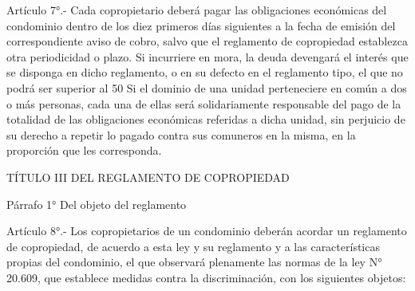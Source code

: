      
    Artículo 7°.- Cada copropietario deberá pagar las obligaciones económicas del condominio dentro de los diez primeros días siguientes a la fecha de emisión del correspondiente aviso de cobro, salvo que el reglamento de copropiedad establezca otra periodicidad o plazo. Si incurriere en mora, la deuda devengará el interés que se disponga en dicho reglamento, o en su defecto en el reglamento tipo, el que no podrá ser superior al 50%
    Si el dominio de una unidad perteneciere en común a dos o más personas, cada una de ellas será solidariamente responsable del pago de la totalidad de las obligaciones económicas referidas a dicha unidad, sin perjuicio de su derecho a repetir lo pagado contra sus comuneros en la misma, en la proporción que les corresponda.

    TÍTULO III
    DEL REGLAMENTO DE COPROPIEDAD
   


    Párrafo 1°
    Del objeto del reglamento

     
    Artículo 8°.- Los copropietarios de un condominio deberán acordar un reglamento de copropiedad, de acuerdo a esta ley y su reglamento y a las características propias del condominio, el que observará plenamente las normas de la ley N° 20.609, que establece medidas contra la discriminación, con los siguientes objetos:
     
